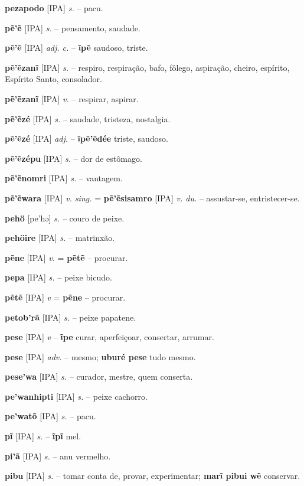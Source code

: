 \textbf{pezapodo} [IPA] \textit{s.} -- pacu.

\textbf{pẽ'ẽ} [IPA] \textit{s.} -- pensamento, saudade.

\textbf{pẽ'ẽ} [IPA] \textit{adj. c.} -- \textbf{ĩpẽ} saudoso, triste.

\textbf{pẽ'ẽzanĩ} [IPA] \textit{s.} -- respiro, respiração, bafo, fôlego, aspiração, cheiro, espírito, Espírito Santo, consolador.

\textbf{pẽ'ẽzanĩ} [IPA] \textit{v.} -- respirar, aspirar.

\textbf{pẽ'ẽzé} [IPA] \textit{s.} -- saudade, tristeza, nostalgia.

\textbf{pẽ'ẽzé} [IPA] \textit{adj.} -- \textbf{ĩpẽ'ẽdée} triste, saudoso.

\textbf{pẽ'ẽzépu} [IPA] \textit{s.} -- dor de estômago.

\textbf{pẽ'ẽnomri} [IPA] \textit{s.} -- vantagem.

\textbf{pẽ'ẽwara} [IPA] \textit{v. sing.} = \textbf{pẽ'ẽsisamro} [IPA] \textit{v. du.} -- assustar-se, entristecer-se.

\textbf{pehö} [pe'hə] \textit{s.} -- couro de peixe.

\textbf{pehöire} [IPA] \textit{s.} -- matrinxão.

\textbf{pẽne} [IPA] \textit{v.} = \textbf{pẽtẽ} -- procurar.

\textbf{pepa} [IPA] \textit{s.} -- peixe bicudo.

\textbf{pẽtẽ} [IPA] \textit{v} = \textbf{pẽne} -- procurar.

\textbf{petob'rã} [IPA] \textit{s.} -- peixe papatene.

\textbf{pese} [IPA] \textit{v} -- \textbf{ĩpe} curar, aperfeiçoar, consertar, arrumar.

\textbf{pese} [IPA] \textit{adv.} -- mesmo; \textbf{uburé pese} tudo mesmo.

\textbf{pese'wa} [IPA] \textit{s.} -- curador, mestre, quem conserta.

\textbf{pe'wanhipti} [IPA] \textit{s.} -- peixe cachorro.

\textbf{pe'watõ} [IPA] \textit{s.} -- pacu.

\textbf{pĩ} [IPA] \textit{s.} -- \textbf{ĩpĩ} mel.

\textbf{pi'ã} [IPA] \textit{s.} -- anu vermelho.

\textbf{pibu} [IPA] \textit{s.} -- tomar conta de, provar, experimentar; \textbf{marĩ pibui wẽ} conservar.

